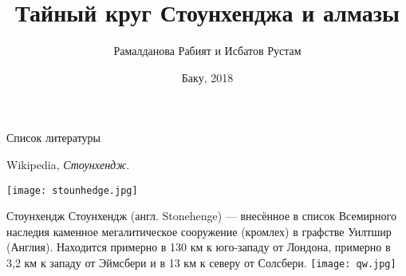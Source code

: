 \documentclass{beamer}
\begin{document}
\title{Тайный круг Стоунхенджа и алмазы}  
\author{Рамалданова Рабият и Исбатов Рустам}
\date{Баку, 2018} 
\frame{\titlepage} 

\begin{frame}{Список литературы}
\begin{thebibliography}{10}
\beamertemplatebookbibitems
{}
{\sc Wikipedia}, {\em Стоунхендж}.
\end{thebibliography}
\centering\texttt{[image: stounhedge.jpg]}\par
\end{frame}

\begin{frame}{Стоунхендж}
Стоунхендж (англ. Stonehenge) — внесённое в список Всемирного наследия каменное мегалитическое сооружение (кромлех) в графстве Уилтшир (Англия). 
Находится примерно в 130 км к юго-западу от Лондона, примерно в 3,2 км к западу от Эймсбери и в 13 км к северу от Солсбери. 
\centering\texttt{[image: qw.jpg]}\par
\end{frame}
\end{document}
